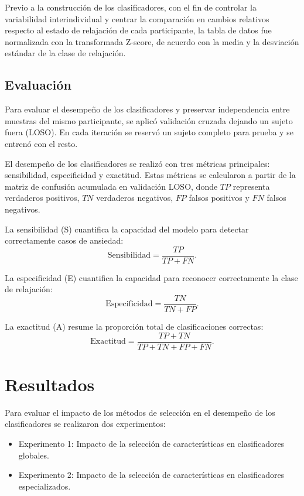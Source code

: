 \documentclass[runningheads]{llncs}
\begin{document}
\FloatBarrier

Previo a la construcción de los clasificadores, con el fin de controlar la variabilidad
interindividual y centrar la comparación en cambios relativos respecto al estado
de relajación de cada participante, la tabla de datos fue normalizada con la transformada Z-score, de acuerdo con la media y la desviación estándar de la clase de relajación.

\subsection{Evaluación}
Para evaluar el desempeño de los clasificadores y preservar independencia entre muestras del mismo participante, se aplicó validación cruzada dejando un sujeto fuera (LOSO). En cada iteración se reservó un sujeto completo para prueba y se entrenó con el resto.

El desempeño de los clasificadores se realizó con tres métricas principales: sensibilidad, especificidad y exactitud. Estas métricas se calcularon a partir de la matriz de confusión acumulada en validación LOSO, donde $TP$ representa verdaderos positivos, $TN$ verdaderos negativos, $FP$ falsos positivos y $FN$ falsos negativos.

La sensibilidad (S) cuantifica la capacidad del modelo para detectar correctamente casos de ansiedad:
\begin{equation}
\mathrm{Sensibilidad}=\frac{TP}{TP+FN}.
\end{equation}

La especificidad (E) cuantifica la capacidad para reconocer correctamente la clase de relajación:
\begin{equation}
\mathrm{Especificidad}=\frac{TN}{TN+FP}.
\end{equation}

La exactitud (A) resume la proporción total de clasificaciones correctas:
\begin{equation}
\mathrm{Exactitud}=\frac{TP+TN}{TP+TN+FP+FN}.
\end{equation}

\section{Resultados}
Para evaluar el impacto de los métodos de selección en el desempeño de los clasificadores se realizaron dos experimentos:

\begin{itemize}
	\item Experimento 1: Impacto de la selección de características en clasificadores globales.
	\item Experimento 2: Impacto de la selección de características en clasificadores especializados.
\end{itemize}
\end{document}
